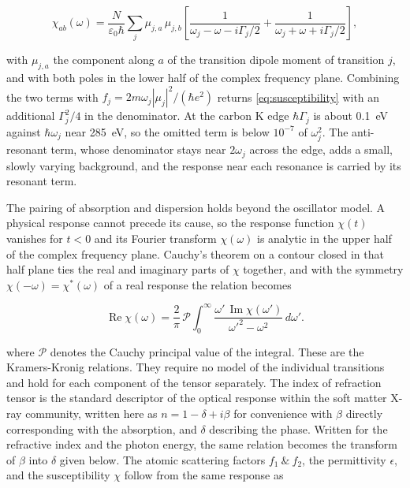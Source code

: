 \begin{equation}
  \chi_{ab}(\omega) = \frac{N}{\varepsilon_{0}\hbar}\sum_{j}\mu_{j,a}\,\mu_{j,b}\left[ \frac{1}{\omega_{j} - \omega - i\Gamma_{j}/2} + \frac{1}{\omega_{j} + \omega + i\Gamma_{j}/2} \right],
  \label{eq:sos-susceptibility}
\end{equation}

with \(\mu_{j,a}\) the component along \(a\) of the transition dipole moment of transition \(j\), and with both poles in the lower half of the complex frequency plane.\autocite{kuzykNonlinearOpticsStudents2017} Combining the two terms with \(f_{j} = 2m\omega_{j}|\mu_{j}|^{2}/(\hbar e^{2})\) returns \cref{eq:susceptibility} with an additional \(\Gamma_{j}^{2}/4\) in the denominator. At the carbon K edge \(\hbar\Gamma_{j}\) is about \qty{0.1}{eV} against \(\hbar\omega_{j}\) near \qty{285}{eV}, so the omitted term is below \(10^{-7}\) of \(\omega_{j}^{2}\). The anti-resonant term, whose denominator stays near \(2\omega_{j}\) across the edge, adds a small, slowly varying background, and the response near each resonance is carried by its resonant term.

The pairing of absorption and dispersion holds beyond the oscillator model. A physical response cannot precede its cause, so the response function \(\chi(t)\) vanishes for \(t < 0\) and its Fourier transform \(\chi(\omega)\) is analytic in the upper half of the complex frequency plane.\autocite{tollCausalityDispersionRelation1956} Cauchy's theorem on a contour closed in that half plane ties the real and imaginary parts of \(\chi\) together, and with the symmetry \(\chi( - \omega) = \chi^{*}(\omega)\) of a real response the relation becomes

\begin{equation}
  \operatorname{Re}\chi(\omega) = \frac{2}{\pi}\,\mathcal{P}\int_{0}^{\infty}\frac{\omega'\, \operatorname{Im}\chi(\omega')}{\omega'^{2} - \omega^{2}}\, d\omega'.
  \label{eq:kk-chi}
\end{equation}

where \(\mathcal{P}\) denotes the Cauchy principal value of the integral. These are the Kramers-Kronig relations.\autocite{kramersDiffusionLumierePar1927,del.kronigTheoryDispersionXRays1926} They require no model of the individual transitions and hold for each component of the tensor separately. The index of refraction tensor is the standard descriptor of the optical response within the soft matter X-ray community, written here as \(n = 1 - \delta + i\beta\) for convenience with \(\beta\) directly corresponding with the absorption, and \(\delta\) describing the phase. Written for the refractive index and the photon energy, the same relation becomes the transform of \(\beta\) into \(\delta\) given below. The atomic scattering factors \(f_{1}\ \&\ f_{2}\), the permittivity \(\epsilon\), and the susceptibility \(\chi\) follow from the same response as

